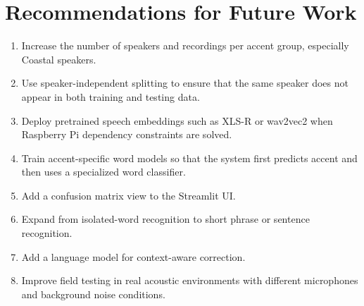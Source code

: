 \documentclass[12pt,a4paper]{report}
\begin{document}
\section{Recommendations for Future Work}
\begin{enumerate}[label=\alph*)]
    \item Increase the number of speakers and recordings per accent group, especially Coastal speakers.
    \item Use speaker-independent splitting to ensure that the same speaker does not appear in both training and testing data.
    \item Deploy pretrained speech embeddings such as XLS-R or wav2vec2 when Raspberry Pi dependency constraints are solved.
    \item Train accent-specific word models so that the system first predicts accent and then uses a specialized word classifier.
    \item Add a confusion matrix view to the Streamlit UI.
    \item Expand from isolated-word recognition to short phrase or sentence recognition.
    \item Add a language model for context-aware correction.
    \item Improve field testing in real acoustic environments with different microphones and background noise conditions.
\end{enumerate}
\end{document}

